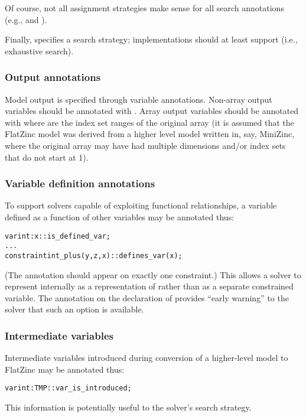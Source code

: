 \documentclass[a4paper]{article}
\begin{document}
Of course, not all assignment strategies make sense for all search
annotations (e.g.,  and ).

Finally, \fzstrategyannotation{} specifies a search strategy;
implementations should at least support  (i.e., exhaustive
search).

\subsubsection{Output annotations}

Model output is specified through variable annotations.
Non-array output variables should be annotated with
.
Array output variables should be annotated with
where  are the index set ranges of the
original array (it is assumed that the FlatZinc model was derived from a
higher level model written in, say, MiniZinc, where the original array
may have had multiple dimensions and/or index sets that do not start at
1).

\subsubsection{Variable definition annotations}

To support solvers capable of exploiting functional relationships, a
variable defined as a function of other variables may be annotated thus:
\begin{alltt}
var int: x :: is_defined_var;
...
constraint int_plus(y, z, x) :: defines_var(x);
\end{alltt}
(The  annotation should appear on exactly one
constraint.)
This allows a solver to represent  internally as a representation
of  rather than as a separate constrained variable.
The  annotation on the declaration of 
provides ``early warning'' to the solver that such an option is
available.

\subsubsection{Intermediate variables}

Intermediate variables introduced during conversion of a higher-level
model to FlatZinc may be annotated thus:
\begin{alltt}
var int: TMP :: var_is_introduced;
\end{alltt}
This information is potentially useful to the solver's search strategy.
\end{document}
